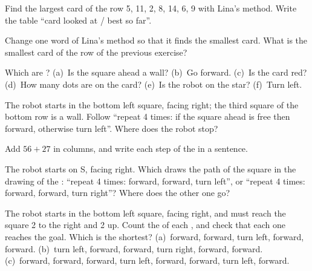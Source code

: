 \begin{exercise}[$\star$]\label{exo:g4:algorithms-repeat-and-decide:3}
Find the largest card of the row 5, 11, 2, 8, 14, 6, 9 with Lina's method.
Write the table ``card looked at / best so far''.
\end{exercise}

\begin{exercise}[$\star$]\label{exo:g4:algorithms-repeat-and-decide:4}
Change one word of Lina's method so that it finds the smallest card. What is
the smallest card of the row of the previous exercise?
\end{exercise}

\begin{exercise}[$\star$]\label{exo:g4:algorithms-repeat-and-decide:5}
Which are ? (a)~Is the square ahead a wall? (b)~Go forward. (c)~Is
the card red? (d)~How many dots are on the card? (e)~Is the robot on the star?
(f)~Turn left.
\end{exercise}

\begin{exercise}[$\star$]\label{exo:g4:algorithms-repeat-and-decide:6}
The robot starts in the bottom left square, facing right; the third square of
the bottom row is a wall. Follow ``repeat 4 times: if the square ahead is free
then forward, otherwise turn left''. Where does the robot stop?
\end{exercise}

\begin{exercise}[$\star$]\label{exo:g4:algorithms-repeat-and-decide:7}
Add $56 + 27$ in columns, and write each step of the  in a sentence.
\end{exercise}

\begin{exercise}[$\star$]\label{exo:g4:algorithms-repeat-and-decide:8}
The robot starts on S, facing right. Which  draws the path of the
square in the drawing of the : ``repeat 4 times: forward, forward, turn
left'', or ``repeat 4 times: forward, forward, turn right''? Where does the
other one go?
\end{exercise}

\begin{exercise}[$\star\star$]\label{exo:g4:algorithms-repeat-and-decide:9}
The robot starts in the bottom left square, facing right, and must reach the
square 2 to the right and 2 up. Count the  of each , and
check that each one reaches the goal. Which is the shortest?
(a)~forward, forward, turn left, forward, forward.
(b)~turn left, forward, forward, turn right, forward, forward.
(c)~forward, forward, forward, turn left, forward, forward, turn left, forward.
\end{exercise}

